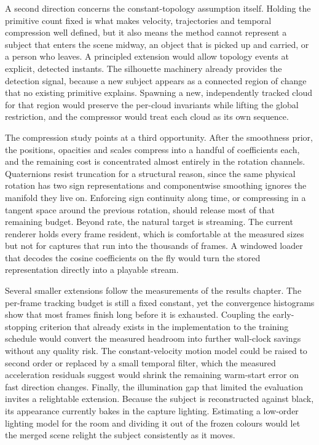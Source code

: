A second direction concerns the constant-topology assumption itself. Holding the
primitive count fixed is what makes velocity, trajectories and temporal
compression well defined, but it also means the method cannot represent a subject
that enters the scene midway, an object that is picked up and carried, or a person
who leaves. A principled extension would allow topology events at explicit,
detected instants. The silhouette machinery already provides the detection signal,
because a new subject appears as a connected region of change that no existing
primitive explains. Spawning a new, independently tracked cloud for that region
would preserve the per-cloud invariants while lifting the global restriction, and
the compressor would treat each cloud as its own sequence.

The compression study points at a third opportunity. After the smoothness prior,
the positions, opacities and scales compress into a handful of coefficients each,
and the remaining cost is concentrated almost entirely in the rotation channels.
Quaternions resist truncation for a structural reason, since the same physical
rotation has two sign representations and componentwise smoothing ignores the
manifold they live on. Enforcing sign continuity along time, or compressing in a
tangent space around the previous rotation, should release most of that remaining
budget. Beyond rate, the natural target is streaming. The current renderer holds
every frame resident, which is comfortable at the measured sizes but not for
captures that run into the thousands of frames. A windowed loader that decodes the
cosine coefficients on the fly would turn the stored representation directly into
a playable stream.

Several smaller extensions follow the measurements of the results chapter. The
per-frame tracking budget is still a fixed constant, yet the convergence
histograms show that most frames finish long before it is exhausted. Coupling the
early-stopping criterion that already exists in the implementation to the training
schedule would convert the measured headroom into further wall-clock savings
without any quality risk. The constant-velocity motion model could be raised to
second order or replaced by a small temporal filter, which the measured
acceleration residuals suggest would shrink the remaining warm-start error on
fast direction changes. Finally, the illumination gap that limited the evaluation
invites a relightable extension. Because the subject is reconstructed against
black, its appearance currently bakes in the capture lighting. Estimating a
low-order lighting model for the room and dividing it out of the frozen colours
would let the merged scene relight the subject consistently as it moves.


